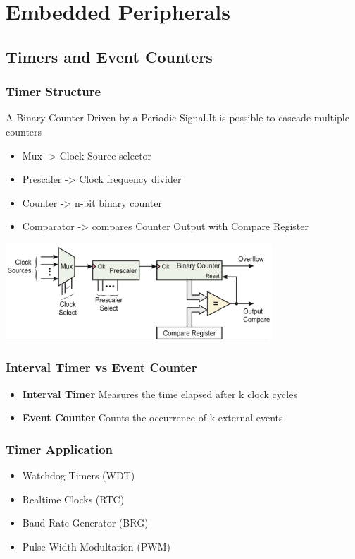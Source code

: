 \section{Embedded Peripherals}
\subsection{Timers and Event Counters}
\subsubsection{Timer Structure}
A Binary Counter Driven by a Periodic Signal.It is possible to cascade multiple counters\\
\vspace{1cm}
\begin{minipage}{9cm}
	\begin{itemize}
		\item Mux -> Clock Source selector
		\item Prescaler -> Clock frequency divider
		\item Counter -> n-bit binary counter
		\item Comparator -> compares Counter Output with Compare Register
	\end{itemize}
\end{minipage}
\begin{minipage}{10cm}
	\includegraphics[width=10cm]{images/timerstructure.png} 
\end{minipage}
\begin{multicols}{2}
	\subsubsection{Interval Timer vs Event Counter}
	\begin{itemize}
		\item \textbf{Interval Timer}
		\subitem Measures the time elapsed after k clock cycles
		\item \textbf{Event Counter}
		\subitem Counts the occurrence of k external events
	\end{itemize}
	
	\subsubsection{Timer Application}
	\begin{itemize}
		\item Watchdog Timers (WDT)
		\item Realtime Clocks (RTC)
		\item Baud Rate Generator (BRG)
		\item Pulse-Width Modultation (PWM)
	\end{itemize}
\end{multicols}

